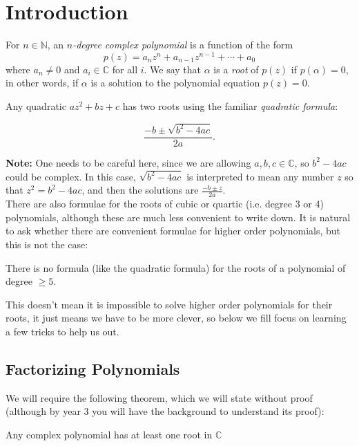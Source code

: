 \documentclass[11pt,dvipsnames]{book}
\numberwithin{equation}{section} %
\numberwithin{figure}{section} %
\numberwithin{table}{section} %
\begin{document}
\section{Introduction}



\begin{definition}
For $n\in\mathbb{N}$, an {\it $n$-degree complex polynomial} is a function of the form 
\[
p(z)=a_nz^n + a_{n-1}z^{n-1} + \cdots + a_0
\]
where $a_n \neq 0$ and $a_i \in \mathbb{C}$ for all $i$. We say that $\alpha$ is a {\it root} of $p(z)$ if $p(\alpha)=0$, in other words, if $\alpha$ is a solution to the polynomial equation $p(z)=0$.
\end{definition}



Any quadratic $az^2+bz+c$ has  two roots using the familiar {\it quadratic formula}:

\[\frac{-b\pm \sqrt{b^2-4ac}}{2a}.\]

{\bf Note:} One needs to be careful here, since we are allowing $a,b,c\in\mathbb{C}$, so  $b^2-4ac$ could be complex. In this case, $\sqrt{b^2-4ac}$ is interpreted to mean any number $z$ so that $z^2=b^2-4ac$, and then the solutions are $\frac{-b\pm z}{2a}$.\\


 There are also formulae for the roots of cubic or quartic (i.e. degree 3 or 4) polynomials, although these are much less convenient to write down. It is natural to ask whether there are convenient formulae for higher order polynomials, but this is not the case:


\begin{theorem} There is no formula (like the quadratic formula) for the roots of a polynomial of degree $\geq 5$.
\end{theorem}


This doesn't mean it is impossible to solve higher order polynomials for their roots, it just means we have to be more clever, so below we fill focus on learning a few tricks to help us out.
 

\subsection{Factorizing Polynomials}

We will require the following theorem, which we will state without proof (although by year 3 you will have the background to understand its proof):

\begin{theorem}
Any complex polynomial has at least one root in $\mathbb{C}$
\end{theorem}
\end{document}
